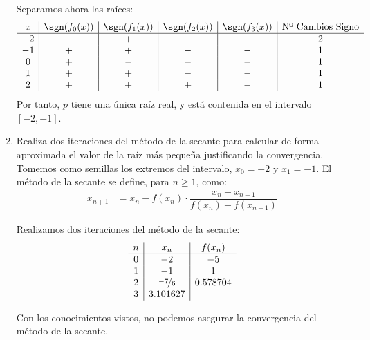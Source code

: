 \begin{ejercicio}
\begin{enumerate}
        Separamos ahora las raíces:
        \begin{equation*}
            \begin{array}{c|c|c|c|c|c}
                x & \sgn(f_0(x)) & \sgn(f_1(x)) & \sgn(f_2(x)) & \sgn(f_3(x)) & \text{Nº Cambios Signo}\\ \hline
                -2 & - & + & - & - & 2\\
                -1 & + & + & - & - & 1\\
                0 & + & - & - & - & 1\\
                1 & + & + & - & - & 1\\
                2 & + & + & + & - & 1
            \end{array}
        \end{equation*}
        Por tanto, $p$ tiene una única raíz real, y está contenida en el intervalo $[-2,-1]$.
        \item Realiza dos iteraciones del método de la secante para calcular de forma aproximada el valor de la raíz más pequeña justificando la convergencia.\\
        
        Tomemos como semillas los extremos del intervalo, $x_0=-2$ y $x_1=-1$. El método de la secante se define, para $n\geq 1$, como:
        \begin{align*}
            x_{n+1} &= x_n - f(x_n)\cdot \dfrac{x_n-x_{n-1}}{f(x_n)-f(x_{n-1})}
        \end{align*}

        Realizamos dos iteraciones del método de la secante:
        \begin{equation*}
            \begin{array}{c|c|c}
                n & x_n & f(x_n)\\ \hline
                0 & -2 & -5\\
                1 & -1 & 1\\
                2 & \nicefrac{-7}{6} & 0.578704\\
                3 & 3.101627
            \end{array}
        \end{equation*}

        \begin{observacion}
            Con los conocimientos vistos, no podemos asegurar la convergencia del método de la secante.
        \end{observacion}
    \end{enumerate}
\end{ejercicio}

